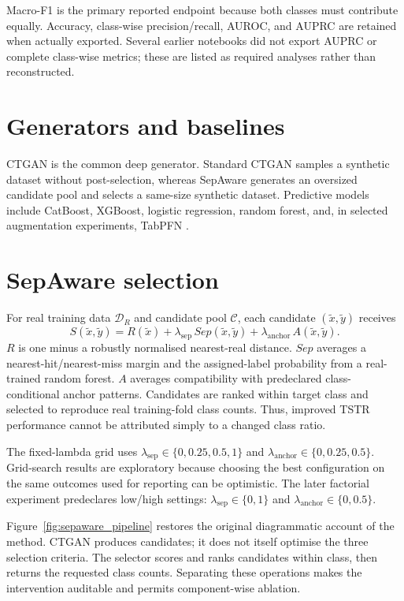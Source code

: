 Macro-F1 is the primary reported endpoint because both classes must contribute equally. Accuracy, class-wise precision/recall, AUROC, and AUPRC are retained when actually exported. Several earlier notebooks did not export AUPRC or complete class-wise metrics; these are listed as required analyses rather than reconstructed.

\section{Generators and baselines}

CTGAN is the common deep generator. Standard CTGAN samples a synthetic dataset without post-selection, whereas SepAware generates an oversized candidate pool and selects a same-size synthetic dataset. Predictive models include CatBoost, XGBoost, logistic regression, random forest, and, in selected augmentation experiments, TabPFN \citep{prokhorenkova2018,chen2016,hollmann2025}.

\section{SepAware selection}

For real training data $\mathcal D_R$ and candidate pool $\mathcal C$, each candidate $(\tilde x,\tilde y)$ receives
\begin{equation}
S(\tilde x,\tilde y)=R(\tilde x)+\lambda_{\mathrm{sep}}\,Sep(\tilde x,\tilde y)+\lambda_{\mathrm{anchor}}\,A(\tilde x,\tilde y).
\label{eq:sepaware}
\end{equation}
$R$ is one minus a robustly normalised nearest-real distance. $Sep$ averages a nearest-hit/nearest-miss margin and the assigned-label probability from a real-trained random forest. $A$ averages compatibility with predeclared class-conditional anchor patterns. Candidates are ranked within target class and selected to reproduce real training-fold class counts. Thus, improved TSTR performance cannot be attributed simply to a changed class ratio.

The fixed-lambda grid uses $\lambda_{\mathrm{sep}}\in\{0,0.25,0.5,1\}$ and $\lambda_{\mathrm{anchor}}\in\{0,0.25,0.5\}$. Grid-search results are exploratory because choosing the best configuration on the same outcomes used for reporting can be optimistic. The later factorial experiment predeclares low/high settings: $\lambda_{\mathrm{sep}}\in\{0,1\}$ and $\lambda_{\mathrm{anchor}}\in\{0,0.5\}$.

Figure~\ref{fig:sepaware_pipeline} restores the original diagrammatic account of the method. CTGAN produces candidates; it does not itself optimise the three selection criteria. The selector scores and ranks candidates within class, then returns the requested class counts. Separating these operations makes the intervention auditable and permits component-wise ablation.

